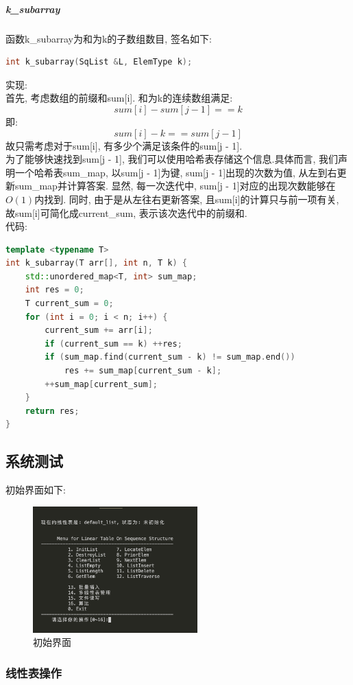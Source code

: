 \documentclass[supercite]{Experimental_Report}
\theoremstyle{definition}
\begin{document}
\subparagraph{k\_subarray}
\noindent
函数k\_subarray为和为k的子数组数目, 签名如下:
\begin{lstlisting}[language=C++, frame=single]
int k_subarray(SqList &L, ElemType k);
\end{lstlisting}

\noindent
实现: \\
首先, 考虑数组的前缀和sum[i]. 和为k的连续数组满足: $$sum[i] - sum[j - 1] == k$$
即: $$sum[i] - k == sum[j - 1]$$
故只需考虑对于sum[i], 有多少个满足该条件的sum[j - 1]. \\
为了能够快速找到sum[j - 1], 我们可以使用哈希表存储这个信息.具体而言, 我们声明一个哈希表sum\_map, 以sum[j - 1]为键, sum[j - 1]出现的次数为值, 从左到右更新sum\_map并计算答案. 显然, 每一次迭代中, sum[j - 1]对应的出现次数能够在$O(1)$内找到. 同时, 由于是从左往右更新答案, 且sum[i]的计算只与前一项有关, 故sum[i]可简化成current\_sum, 表示该次迭代中的前缀和. \\
\noindent
代码:
\begin{lstlisting}[language=C++, frame=single]
template <typename T>
int k_subarray(T arr[], int n, T k) {
	std::unordered_map<T, int> sum_map;
	int res = 0;
	T current_sum = 0;
	for (int i = 0; i < n; i++) {
		current_sum += arr[i];
		if (current_sum == k) ++res;
		if (sum_map.find(current_sum - k) != sum_map.end())
			res += sum_map[current_sum - k];
		++sum_map[current_sum];
	}
	return res;
}
\end{lstlisting}

\newpage

\subsection{系统测试}

\noindent
初始界面如下:
\begin{figure}[htbp]
	\centering
	\includegraphics[width=2.5in]{sq_list/initial_interface.png}
	\caption{初始界面}
	\label{fig1-1}
\end{figure}

\subsubsection{线性表操作}
\end{document}
